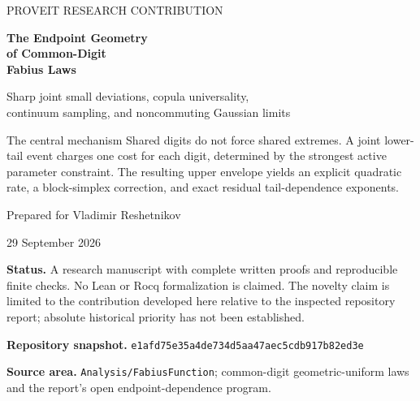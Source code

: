 \documentclass[11pt,a4paper]{article}
\theoremstyle{definition}
\theoremstyle{remark}
\newcommand{\repoSHA}{\texttt{e1afd75e35a4de734d5aa47aec5cdb917b82ed3e}}
\numberwithin{equation}{section}
\begin{document}
\hypersetup{pageanchor=false}
\begin{titlepage}
\thispagestyle{empty}
\vspace*{13mm}
{\small\sffamily\color{accent} PROVEIT RESEARCH CONTRIBUTION\par}
\vspace{8mm}
{\Huge\bfseries\color{ink} The Endpoint Geometry\\[3mm]
of Common-Digit\\[3mm]Fabius Laws\par}
\vspace{9mm}
{\Large Sharp joint small deviations, copula universality,\\[2mm]
continuum sampling, and noncommuting Gaussian limits\par}
\vspace{13mm}
\begin{resultbox}{The central mechanism}
Shared digits do not force shared extremes. A joint lower-tail event charges
one cost for each digit, determined by the strongest active parameter
constraint. The resulting upper envelope yields an explicit quadratic rate,
a block-simplex correction, and exact residual tail-dependence exponents.
\end{resultbox}
\vspace{9mm}
{\large Prepared for Vladimir Reshetnikov\par}
\vspace{2mm}
{\large 29 September 2026\par}
\vfill
\noindent\begin{minipage}{\textwidth}
\small
\textbf{Status.} A research manuscript with complete written proofs and
reproducible finite checks. No Lean or Rocq formalization is claimed.
The novelty claim is limited to the contribution developed here relative to
the inspected repository report; absolute historical priority has not been
established.\par\medskip
\textbf{Repository snapshot.} \repoSHA\par
\textbf{Source area.} \texttt{Analysis/FabiusFunction}; common-digit
geometric-uniform laws and the report's open endpoint-dependence program.
\end{minipage}
\end{titlepage}
\hypersetup{pageanchor=true}
\end{document}
